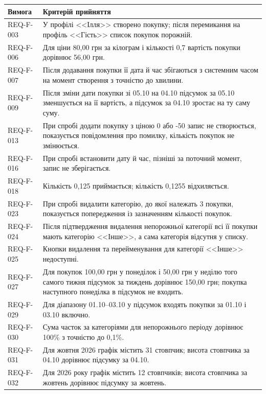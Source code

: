 \documentclass[12pt,a4paper]{article}
\begin{document}
\begin{longtable}{@{}p{}p{}@{}}
\toprule
\textbf{Вимога} & \textbf{Критерій прийняття} \\
\midrule
\endhead
REQ-F-003 & У профілі <<Ілля>> створено покупку; після перемикання на профіль <<Гість>> список покупок порожній. \\
REQ-F-006 & Для ціни 80,00 грн за кілограм і кількості 0,7 вартість покупки дорівнює 56,00 грн. \\
REQ-F-007 & Після додавання покупки її дата й час збігаються з системним часом на момент створення з точністю до хвилини. \\
REQ-F-009 & Після зміни дати покупки зі 05.10 на 04.10 підсумок за 05.10 зменшується на її вартість, а підсумок за 04.10 зростає на ту саму суму. \\
REQ-F-013 & При спробі додати покупку з ціною 0 або -50 запис не створюється, показується повідомлення про помилку, кількість покупок не змінюється. \\
REQ-F-016 & При спробі встановити дату й час, пізніші за поточний момент, запис не зберігається. \\
REQ-F-018 & Кількість 0,125 приймається; кількість 0,1255 відхиляється. \\
REQ-F-023 & При спробі видалити категорію, до якої належать 3 покупки, показується попередження із зазначенням кількості покупок. \\
REQ-F-024 & Після підтвердження видалення непорожньої категорії всі її покупки мають категорію <<Інше>>, а сама категорія відсутня у списку. \\
REQ-F-025 & Кнопки видалення та перейменування для категорії <<Інше>> недоступні. \\
REQ-F-027 & Для покупок 100,00 грн у понеділок і 50,00 грн у неділю того самого тижня підсумок за тиждень дорівнює 150,00 грн; покупка наступного понеділка в підсумок не входить. \\
REQ-F-029 & Для діапазону 01.10--03.10 у підсумок входять покупки за 01.10 і 03.10 включно. \\
REQ-F-030 & Сума часток за категоріями для непорожнього періоду дорівнює 100\% з точністю до 0,1\%. \\
REQ-F-031 & Для жовтня 2026 графік містить 31 стовпчик; висота стовпчика за 04.10 дорівнює підсумку за 04.10. \\
REQ-F-032 & Для 2026 року графік містить 12 стовпчиків; висота стовпчика за жовтень дорівнює підсумку за жовтень. \\

\end{longtable}
\end{document}
